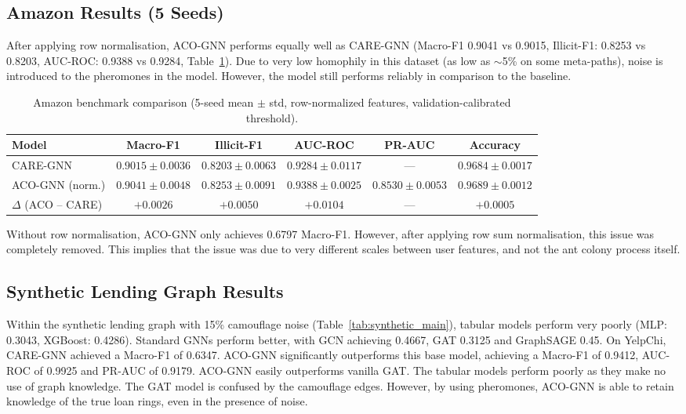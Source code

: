 \subsection{Amazon Results (5 Seeds)}

After applying row normalisation, ACO-GNN performs equally well as CARE-GNN (Macro-F1 0.9041 vs 0.9015, Illicit-F1: 0.8253 vs 0.8203, AUC-ROC: 0.9388 vs 0.9284, Table~\ref{tab:amazon_main}). Due to very low homophily in this dataset (as low as $\sim$5\% on some meta-paths), noise is introduced to the pheromones in the model. However, the model still performs reliably in comparison to the baseline.

\begin{table}[htbp]
\centering
\footnotesize
\setlength{\tabcolsep}{2pt}
\caption[Amazon five-seed benchmark comparison]{Amazon benchmark comparison (5-seed mean $\pm$ std, row-normalized features, validation-calibrated threshold).}
\label{tab:amazon_main}
\begin{tabular*}{\textwidth}{@{\extracolsep{\fill}}lccccc}
\toprule
\textbf{Model} & \textbf{Macro-F1} & \textbf{Illicit-F1} & \textbf{AUC-ROC} & \textbf{PR-AUC} & \textbf{Accuracy} \\
\midrule
CARE-GNN       & $0.9015 \pm 0.0036$ & $0.8203 \pm 0.0063$ & $0.9284 \pm 0.0117$ & --- & $0.9684 \pm 0.0017$ \\
ACO-GNN (norm.) & $0.9041 \pm 0.0048$ & $0.8253 \pm 0.0091$ & $0.9388 \pm 0.0025$ & $0.8530 \pm 0.0053$ & $0.9689 \pm 0.0012$ \\
\midrule
$\Delta$ (ACO -- CARE) & $+0.0026$ & $+0.0050$ & $+0.0104$ & --- & $+0.0005$ \\
\bottomrule
\end{tabular*}
\end{table}

Without row normalisation, ACO-GNN only achieves 0.6797 Macro-F1. However, after applying row sum normalisation, this issue was completely removed. This implies that the issue was due to very different scales between user features, and not the ant colony process itself.

\subsection{Synthetic Lending Graph Results}

Within the synthetic lending graph with 15\% camouflage noise (Table~\ref{tab:synthetic_main}), tabular models perform very poorly (MLP: 0.3043, XGBoost: 0.4286). Standard GNNs perform better, with GCN achieving 0.4667, GAT 0.3125 and GraphSAGE 0.45. On YelpChi, CARE-GNN achieved a Macro-F1 of 0.6347. ACO-GNN significantly outperforms this base model, achieving a Macro-F1 of 0.9412, AUC-ROC of 0.9925 and PR-AUC of 0.9179. ACO-GNN easily outperforms vanilla GAT. The tabular models perform poorly as they make no use of graph knowledge. The GAT model is confused by the camouflage edges. However, by using pheromones, ACO-GNN is able to retain knowledge of the true loan rings, even in the presence of noise.

